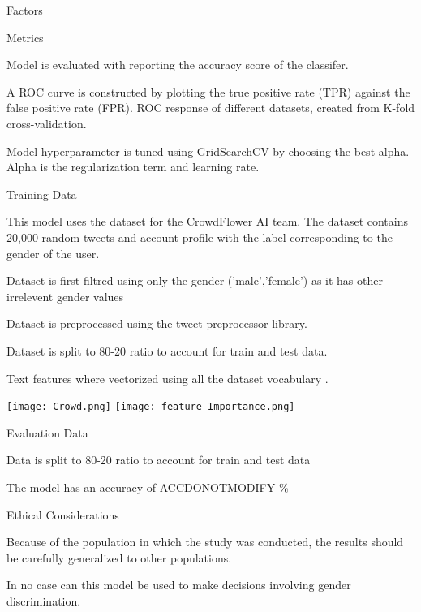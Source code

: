 \documentclass{article}
\begin{document}
\begin{adjustwidth}{-60pt}{-30pt}
\begin{singlespace}
\begin{tcolorbox}[title=\textbf{Model Card - Tweeter Gender Classification },
     breakable, sharp corners, boxrule=0.7pt]
{\begin{multicols}{2}
\begin{mcsection}{Factors}
 \end{mcsection}
 
 \begin{mcsection}{Metrics}
     \item Model is evaluated with reporting the accuracy score of the classifer.
     
     \item A ROC curve is constructed by plotting the true positive rate (TPR) against the false positive rate (FPR). ROC response of different datasets, created from K-fold cross-validation.
     
     \item Model hyperparameter is tuned using GridSearchCV by choosing the best alpha. Alpha is the regularization term and learning rate.
     
 \end{mcsection}
 
 \begin{mcsection}{Training Data}
     \item This model uses the dataset for the CrowdFlower AI team.  The dataset contains 20,000 random tweets and account profile with the label corresponding to the gender of the user.
     \item Dataset is first filtred using only the gender ('male','female') as it has other irrelevent gender values
     \item Dataset is preprocessed using the tweet-preprocessor library. 
     \item Dataset is split to 80-20 ratio to account for train and test data.
     \item Text features where vectorized using all the dataset vocabulary .

 \end{mcsection}

     \texttt{[image: Crowd.png]}
    \texttt{[image: feature\_Importance.png]}
 
 \begin{mcsection}{Evaluation Data}
   
     \item Data is split to 80-20 ratio to account for train and test data
     \item The model has an accuracy of ACCDONOTMODIFY \%
  

 \end{mcsection}
 
 
 
 
 \begin{mcsection}{Ethical Considerations}
     \item Because of the population in which the study was conducted, the results should be carefully generalized to other populations.
     \item In no case can this model be used to make decisions involving gender discrimination.
 \end{mcsection}
 

\end{multicols}}
\end{tcolorbox}
\end{singlespace}
\end{adjustwidth}
\end{document}
